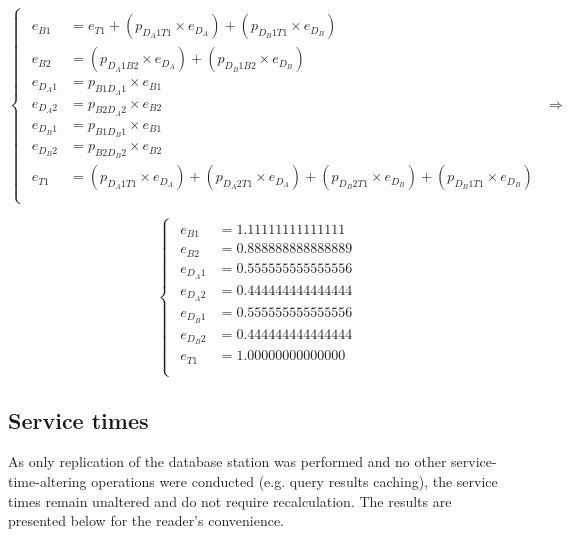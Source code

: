 \[
	\begin{cases}
		\begin{aligned}
		e_{B1} &= e_{T1} + (p_{D_{A}1T1} \times e_{D_{A}}) + (p_{D_{B}1T1} \times e_{D_{B}}) \\
		e_{B2} &= (p_{D_{A}1B2} \times e_{D_{A}}) + (p_{D_{B}1B2} \times e_{D_{B}}) \\
		e_{D_{A}1} &= p_{B1D_{A}1} \times e_{B1} \\
		e_{D_{A}2} &= p_{B2D_{A}2} \times e_{B2} \\
		e_{D_{B}1} &= p_{B1D_{B}1} \times e_{B1} \\
		e_{D_{B}2} &= p_{B2D_{B}2} \times e_{B2} \\
		e_{T1} &= (p_{D_{A}1T1} \times e_{D_{A}}) + (p_{D_{A}2T1} \times e_{D_{A}}) + (p_{D_{B}2T1} \times e_{D_{B}}) + (p_{D_{B}1T1} \times e_{D_{B}})  \\
		\end{aligned}
	\end{cases}
	\Rightarrow
\]

\[
	\begin{cases}
		\begin{aligned}
		e_{B1} &= \num[round-mode=places, round-precision=4]{1.11111111111111} \\
		e_{B2} &= \num[round-mode=places, round-precision=4]{0.888888888888889} \\
		e_{D_{A}1} &= \num[round-mode=places, round-precision=4]{0.555555555555556} \\
		e_{D_{A}2} &= \num[round-mode=places, round-precision=4]{0.444444444444444} \\
		e_{D_{B}1} &= \num[round-mode=places, round-precision=4]{0.555555555555556} \\
		e_{D_{B}2} &= \num[round-mode=places, round-precision=4]{0.444444444444444} \\
		e_{T1} &= \num[round-mode=places, round-precision=4]{1.00000000000000} \\
		\end{aligned}
		\end{cases}
\]

\subsection{Service times}

As only replication of the database station was performed and no other service-time-altering operations were conducted (e.g. query results caching), the service times remain unaltered and do not require recalculation.
The results are presented below for the reader's convenience.

